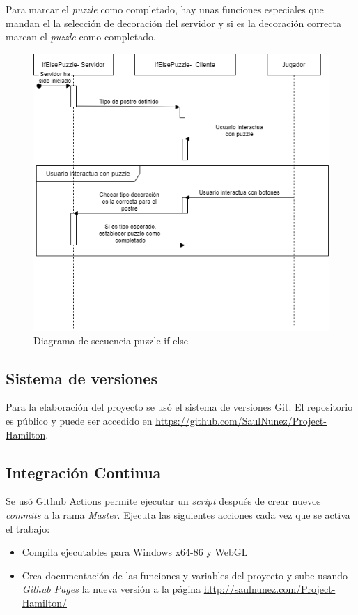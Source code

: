 \begin{itemize}
    Para marcar el \textit{puzzle} como completado, hay unas funciones especiales que mandan el la selección de decoración del servidor y si es la decoración correcta marcan el \textit{puzzle} como completado.
    \begin{figure}[H]
        \centering
        \includegraphics[width=0.8\linewidth]{images/DiagramaSecuenciaPuzzleIfElse.png}
        \caption{Diagrama de secuencia puzzle if else}
        \label{fig:diagrama_sec_if_else}
    \end{figure}
\end{itemize}

\subsection{Sistema de versiones}
Para la elaboración del proyecto se usó el sistema de versiones Git. El repositorio es público y puede ser accedido en \url{https://github.com/SaulNunez/Project-Hamilton}.

\subsection{Integración Continua}
Se usó Github Actions permite ejecutar un \textit{script} después de crear nuevos \textit{commits} a la rama \textit{Master}.
Ejecuta las siguientes acciones cada vez que se activa el trabajo:
\begin{itemize}
    \item Compila ejecutables para Windows x64-86 y WebGL
    \item Crea documentación de las funciones y variables del proyecto y sube usando \textit{Github Pages} la nueva versión a la página \url{http://saulnunez.com/Project-Hamilton/}
\end{itemize}

